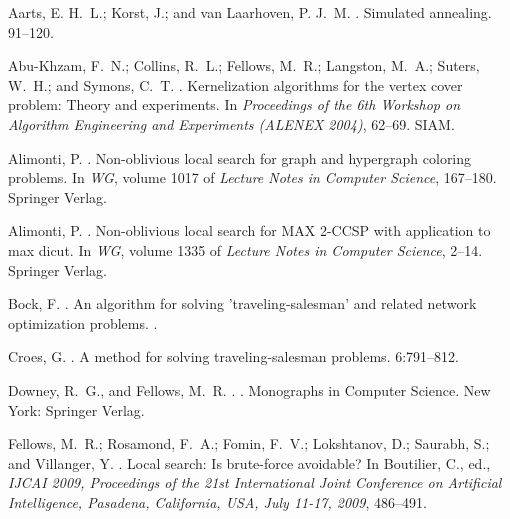 \documentclass[10pt,usletter]{article}
\begin{document}
{




\begin{thebibliography}{}


Aarts, E. H.~L.; Korst, J.; and van Laarhoven, P. J.~M.
.
\newblock Simulated annealing.
  91--120.

Abu-Khzam, F.~N.; Collins, R.~L.; Fellows, M.~R.; Langston, M.~A.; Suters,
  W.~H.; and Symons, C.~T.
. 
\newblock Kernelization algorithms for the vertex cover problem: Theory and
  experiments.
\newblock In {\em Proceedings of the 6th Workshop on Algorithm Engineering and
  Experiments (ALENEX 2004)},  62--69.
\newblock SIAM.

Alimonti, P.
.
\newblock Non-oblivious local search for graph and hypergraph coloring
  problems.
\newblock In {\em WG}, volume 1017 of {\em Lecture Notes in Computer Science},
  167--180.
\newblock Springer Verlag.

Alimonti, P.
.
\newblock Non-oblivious local search for {MAX 2-CCSP} with application to max
  dicut.
\newblock In {\em WG}, volume 1335 of {\em Lecture Notes in Computer Science},
  2--14.
\newblock Springer Verlag.

Bock, F.
.
\newblock An algorithm for solving 'traveling-salesman' and related network
  optimization problems.
.

Croes, G.
.
\newblock A method for solving traveling-salesman problems.
 6:791--812.

Downey, R.~G., and Fellows, M.~R.
.
.
\newblock Monographs in Computer Science. New York: Springer Verlag.

Fellows, M.~R.; Rosamond, F.~A.; Fomin, F.~V.; Lokshtanov, D.; Saurabh, S.; and
  Villanger, Y.
.
\newblock Local search: Is brute-force avoidable?
\newblock In Boutilier, C., ed., {\em IJCAI 2009, Proceedings of the 21st
  International Joint Conference on Artificial Intelligence, Pasadena,
  California, USA, July 11-17, 2009},  486--491.


\end{thebibliography}}
\end{document}
